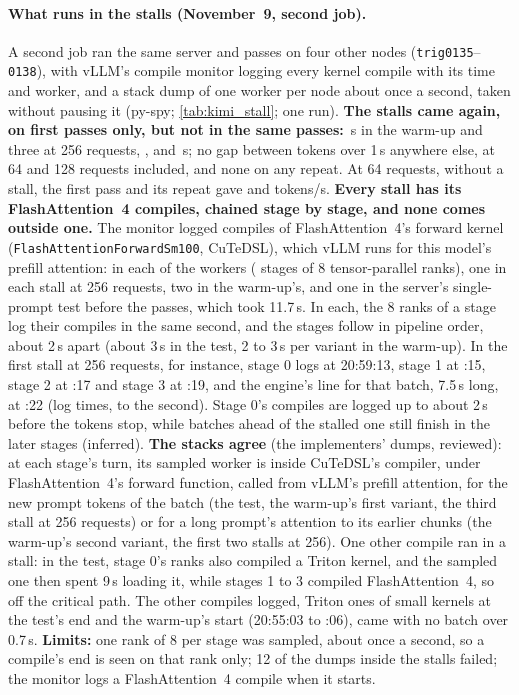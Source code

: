 \paragraph{What runs in the stalls (November~9, second job).} A second job ran the same server and passes on four other nodes (\texttt{trig0135}--\texttt{0138}), with vLLM's compile monitor logging every kernel compile with its time and worker, and a stack dump of one worker per node about once a second, taken without pausing it (py-spy; \cref{tab:kimi_stall}; one run). \textbf{The stalls came again, on first passes only, but not in the same passes:} \TriKcauseWarmStall\,s in the warm-up and three at 256 requests, \TriKcauseTwoFiftySixStall, \TriKcauseTwoFiftySixStallSecond{} and \TriKcauseTwoFiftySixStallThird\,s; no gap between tokens over 1\,s anywhere else, at 64 and 128 requests included, and none on any repeat. At 64 requests, without a stall, the first pass and its repeat gave \TriKcauseSixtyFourFirst{} and \TriKcauseSixtyFourRepeat{} tokens/s. \textbf{Every stall has its FlashAttention~4 compiles, chained stage by stage, and none comes outside one.} The monitor logged \TriKcauseCompiles{} compiles of FlashAttention~4's forward kernel (\texttt{FlashAttentionForwardSm100}, CuTeDSL), which vLLM runs for this model's prefill attention: \TriKcausePerWorker{} in each of the \TriKcauseWorkers{} workers (\TriKcauseStages{} stages of 8 tensor-parallel ranks), one in each stall at 256 requests, two in the warm-up's, and one in the server's single-prompt test before the passes, which took 11.7\,s. In each, the 8 ranks of a stage log their compiles in the same second, and the stages follow in pipeline order, about 2\,s apart (about 3\,s in the test, 2 to 3\,s per variant in the warm-up). In the first stall at 256 requests, for instance, stage 0 logs at 20:59:13, stage 1 at :15, stage 2 at :17 and stage 3 at :19, and the engine's line for that batch, 7.5\,s long, at :22 (log times, to the second). Stage 0's compiles are logged up to about 2\,s before the tokens stop, while batches ahead of the stalled one still finish in the later stages (inferred). \textbf{The stacks agree} (the implementers' dumps, reviewed): at each stage's turn, its sampled worker is inside CuTeDSL's compiler, under FlashAttention~4's forward function, called from vLLM's prefill attention, for the new prompt tokens of the batch (the test, the warm-up's first variant, the third stall at 256 requests) or for a long prompt's attention to its earlier chunks (the warm-up's second variant, the first two stalls at 256). One other compile ran in a stall: in the test, stage 0's ranks also compiled a Triton kernel, and the sampled one then spent 9\,s loading it, while stages 1 to 3 compiled FlashAttention~4, so off the critical path. The other compiles logged, Triton ones of small kernels at the test's end and the warm-up's start (20:55:03 to :06), came with no batch over 0.7\,s. \textbf{Limits:} one rank of 8 per stage was sampled, about once a second, so a compile's end is seen on that rank only; 12 of the dumps inside the stalls failed; the monitor logs a FlashAttention~4 compile when it starts.

